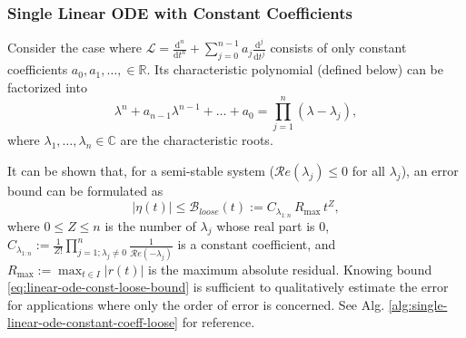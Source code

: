 \documentclass{uai2023}
\newcommand{\Err}{\eta}
\newcommand{\Bound}{\mathcal{B}}
\renewcommand{\L}{\mathcal{L}}
\renewcommand{\Re}[1]{\mathcal{R}e\left(#1\right)}
\begin{document}
\subsubsection{Single Linear ODE with Constant Coefficients}\label{section:single-linear-ode-with-constant-coefficients}
    Consider the case where $\L = \frac{\mathrm{d}^n}{\mathrm{d}t^n} + \sum_{j=0}^{n - 1} a_j \frac{\mathrm{d}^j}{\mathrm{d}t^j}$ consists of only constant coefficients $a_0, a_1, \dots, \in \mathbb{R}$.
    Its characteristic polynomial (defined below) can be factorized into
    {
        \small
        \begin{equation} \label{eq:single-linear-ode-characteristic-polynomial-factorization}
            \lambda^n + a_{n-1}\lambda^{n-1} + \dots + a_0 = \prod_{j=1}^{n}(\lambda - \lambda_j),
        \end{equation}
    }
    where $\lambda_1, \dots, \lambda_n \in \mathbb{C}$ are the characteristic roots. 

    It can be shown that, for a semi-stable system ($\Re{\lambda_j} \leq 0$ for all $\lambda_j$), an error bound can be formulated as
    \begin{equation} \label{eq:linear-ode-const-loose-bound}
        \left|\Err(t)\right| \leq \Bound_{loose}(t) := C_{\lambda_{1:n}}\, R_{\max}\, t^{Z},
    \end{equation}
    where $0\leq Z \leq n$ is the number of $\lambda_j$ whose real part is $0$, $C_{\lambda_{1:n}} := \frac{1}{Z!}\prod_{j=1; \lambda_j\neq 0}^{n} \frac{1}{\Re{-\lambda_j}}$ is a constant coefficient, and $R_{\max}:=\max_{t\in I} |r(t)|$ is the maximum absolute residual. 
    Knowing bound \ref{eq:linear-ode-const-loose-bound} is sufficient to qualitatively estimate the error for applications where only the order of error is concerned. See Alg. \ref{alg:single-linear-ode-constant-coeff-loose} for reference.
\end{document}
